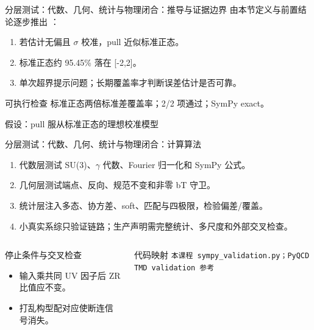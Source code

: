 \begin{frame}[t]{分层测试：代数、几何、统计与物理闭合：推导与证据边界}
\footnotesize
{}\quad 由本节定义与前置结论逐步推出 ：
\begin{enumerate}
\item 若估计无偏且 \ensuremath{\sigma} 校准，pull 近似标准正态。
\item 标准正态约 95.45\% 落在 [-2,2]。
\item 单次超界提示问题；长期覆盖率才判断误差估计是否可靠。
\end{enumerate}\begin{block}{可执行检查}
\quad 标准正态两倍标准差覆盖率；2/2 项通过；SymPy exact。
\par\scriptsize 假设：pull 服从标准正态的理想校准模型
\end{block}
\end{frame}

\begin{frame}[t]{分层测试：代数、几何、统计与物理闭合：计算算法}
\footnotesize
{}\begin{enumerate}
\item 代数层测试 SU(3)、\ensuremath{\gamma} 代数、Fourier 归一化和 SymPy 公式。
\item 几何层测试端点、反向、规范不变和非零 bT 守卫。
\item 统计层注入多态、协方差、soft、匹配与四极限，检验偏差/\allowbreak{}覆盖。
\item 小真实系综只验证链路；生产声明需完整统计、多尺度和外部交叉检查。
\end{enumerate}\begin{columns}[T,onlytextwidth]
\begin{block}{停止条件与交叉检查}\scriptsize\begin{itemize}
\item[\CheckMark] 输入乘共同 UV 因子后 ZR 比值应不变。
\item[\CheckMark] 打乱构型配对应使断连信号消失。
\end{itemize}\end{block}
\begin{block}{代码映射}
\scriptsize \texttt{本课程 sympy\_\allowbreak{}validation.\allowbreak{}py；PyQCD TMD validation 参考}
\end{block}\end{columns}\end{frame}

